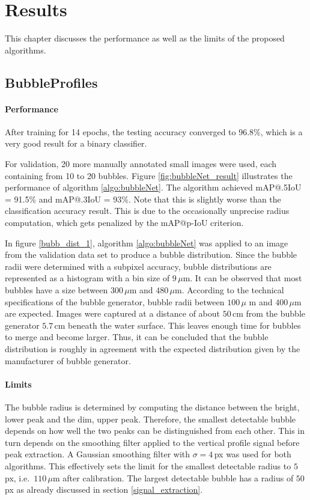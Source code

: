 \chapter{Results}\label{results}
	This chapter discusses the performance as well as the limits of the proposed algorithms. 
	
		\section{BubbleProfiles}\label{result_profiles}
			
			\subsubsection{Performance}
			After training for 14 epochs, the testing accuracy converged to 96.8\%, which is a very good result for a binary classifier. 

			For validation, 20 more manually annotated small images were used, each containing from 10 to 20 bubbles. Figure \ref{fig:bubbleNet_result} illustrates the performance of algorithm \ref{algo:bubbleNet}.  
			The algorithm achieved mAP@.5IoU = 91.5\% and mAP@.3IoU = 93\%. Note that this is slightly worse than the classification accuracy result. This is due to the occasionally unprecise radius computation, which gets penalized by the mAP@p-IoU criterion. 
			
			In figure \ref{bubb_dist_1}, algorithm \ref{algo:bubbleNet} was applied to an image from the validation data set to produce a bubble distribution. Since the bubble radii were determined with a subpixel accuracy, bubble distributions are represented as a histogram with a bin size of $9 \, \mu$m. It can be observed that most bubbles have a size between $300 \, \mu$m and $480 \, \mu$m. According to the technical specifications of the bubble generator, bubble radii between $100 \, \mu$ m and $400 \, \mu$m are expected. Images were captured at a distance of about $50$\,cm from the bubble generator $5.7$\,cm beneath the water surface. This leaves enough time for bubbles to merge and become larger. Thus, it can be concluded that the bubble distribution is roughly in agreement with the expected distribution given by the manufacturer of bubble generator.
			
			\subsubsection{Limits}
			The bubble radius is determined by computing the distance between the bright, lower peak and the dim, upper peak. Therefore, the smallest detectable bubble depends on how well the two peaks can be distinguished from each other.
			 This in turn depends on the smoothing filter applied to the vertical profile signal before peak extraction. A Gaussian smoothing filter with $\sigma = 4$\,px was used for both algorithms. This effectively sets the limit for the smallest detectable radius to $5$\,px, i.e.\ $110 \, \mu$m after calibration. The largest detectable bubble has a radius of $50$\,px as already discussed in section \ref{signal_extraction}. 
			 
